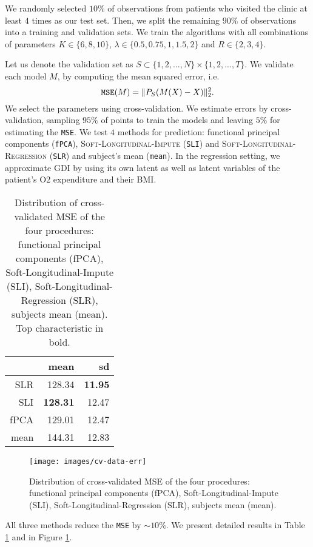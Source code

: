 \documentclass[preprint]{imsart}
\numberwithin{equation}{section}
\theoremstyle{plain}
\begin{document}
We randomly selected $10\%$ of observations from patients who visited the clinic at least $4$ times as our test set. Then, we split the remaining $90\%$ of observations into a training and validation sets. We train the algorithms with all combinations of parameters $K \in \{6,8,10\}$, $\lambda \in \{0.5, 0.75, 1, 1.5, 2\}$ and $R \in \{2,3,4\}$.

Let us denote the validation set as $S \subset \{1,2,...,N\} \times \{1,2,...,T\}$. We validate each model $M$, by computing the mean squared error, i.e.
\[
\verb|MSE|(M) = \|P_S(M(X) - X)\|_2^2.
\]
We select the parameters using cross-validation. We estimate errors by cross-validation, sampling $95\%$ of points to train the models and leaving $5\%$ for estimating the \verb|MSE|. We test $4$ methods for prediction: functional principal components (\verb|fPCA|), \textsc{Soft-Longitudinal-Impute} (\verb|SLI|) and \textsc{Soft-Longitudinal-Regression} (\verb|SLR|) and subject's mean (\verb|mean|). In the regression setting, we approximate GDI by using its own latent as well as latent variables of the patient's O2 expenditure and their BMI.

\begin{table}[ht]
\centering
\begin{tabular}{rrr}
  \hline
 & mean & sd \\ 
  \hline
  SLR & 128.34 & \textbf{11.95} \\ 
  SLI & \textbf{128.31} & 12.47 \\ 
  fPCA & 129.01 & 12.47 \\ 
  mean & 144.31 & 12.83 \\ 
   \hline
\end{tabular}\label{tbl:data-res}
\caption{Distribution of cross-validated MSE of the four procedures: functional principal components (fPCA), Soft-Longitudinal-Impute (SLI), Soft-Longitudinal-Regression (SLR), subjects mean (mean). Top characteristic in bold.}
\end{table}

\begin{figure}[h!]
  \texttt{[image: images/cv-data-err]}
  \caption{Distribution of cross-validated MSE of the four procedures: functional principal components (fPCA), Soft-Longitudinal-Impute (SLI), Soft-Longitudinal-Regression (SLR), subjects mean (mean).}
  \label{fig:Boxplots}
\end{figure}

All three methods reduce the \verb|MSE| by $\sim 10\%$. We present detailed results in Table \ref{tbl:data-res} and in Figure \ref{fig:Boxplots}. 
\end{document}

